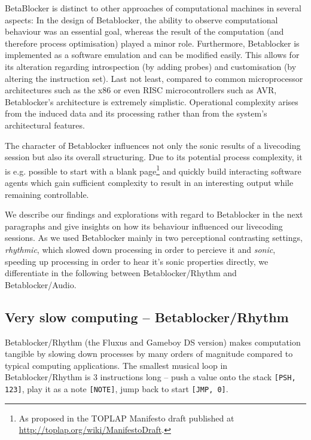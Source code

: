 \documentclass[letterpaper, 12pt]{article}
\begin{document}
BetaBlocker is distinct to other approaches of computational machines in several aspects:
In the design of Betablocker, the ability to observe computational behaviour was an essential goal, whereas the result of the computation (and therefore process optimisation) played a minor role.  
Furthermore, Betablocker is implemented as a software emulation and can be modified easily.
This allows for its alteration regarding introspection (by adding probes) and customisation (by altering the instruction set).
Last not least, compared to common microprocessor architectures such as the x86 \citep{alpert1993-arc}
or even RISC
microcontrollers \citep{kane1988-mip} such as AVR, Betablocker's architecture is extremely simplistic.
Operational complexity arises from the induced data and its processing rather than from the system's architectural features.

The character of Betablocker influences not only the sonic results of a livecoding session but also its overall structuring.
Due to its potential process complexity, it is e.g. possible to start with a blank page\footnote{As proposed in the TOPLAP Manifesto draft published at \url{http://toplap.org/wiki/ManifestoDraft}.}
and quickly build interacting software agents which gain sufficient complexity to result in an interesting output while remaining controllable.

We describe our findings and explorations with regard to Betablocker in the next paragraphs and give insights on how its behaviour influenced our livecoding sessions.
As we used Betablocker mainly in two perceptional contrasting settings, \emph{rhythmic}, which slowed down processing in order to percieve it and \emph{sonic}, speeding up processing in order to hear it's sonic properties directly, we differentiate in the following between Betablocker/Rhythm and Betablocker/Audio.
\parskip 18pt

\subsection{Very slow computing -- Betablocker/Rhythm}
\label{sub:slow_computing}

Betablocker/Rhythm (the Fluxus and Gameboy DS version) makes computation tangible by slowing down processes by many orders of magnitude compared to typical computing applications. 
The smallest musical loop in Betablocker/Rhythm is 3 instructions long -- push a value onto the stack \texttt{[PSH, 123]}, play it as a note \texttt{[NOTE]}, jump back to start \texttt{[JMP, 0]}. 
\end{document}
